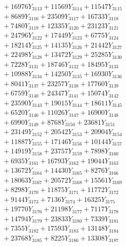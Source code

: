 \documentclass[a4paper,10pt]{article}
\begin{document}
{\begin{align}
&\;  + 16976 Y_{3113} + 11569 Y_{3114} + 11547 Y_{3115} \\[0.3ex]
&\;  + 8689 Y_{3116} + 23509 Y_{3117} + 16733 Y_{3118} \\[0.5ex]\allowbreak
&\;  + 7480 Y_{3119} + 12335 Y_{3120} + 23123 Y_{3121} \\[0.3ex]
&\;  + 24796 Y_{3122} + 17449 Y_{3123} + 6775 Y_{3124} \\[0.3ex]
&\;  + 18214 Y_{3125} + 14135 Y_{3126} + 21442 Y_{3127} \\[0.3ex]
&\;  + 22498 Y_{3128} + 13472 Y_{3129} + 25285 Y_{3130} \\[0.3ex]
&\;  + 7228 Y_{3131} + 18746 Y_{3132} + 18495 Y_{3133} \\[0.3ex]
&\;  + 10988 Y_{3134} + 14250 Y_{3135} + 16930 Y_{3136} \\[0.3ex]
&\;  + 8041 Y_{3137} + 23257 Y_{3138} + 17760 Y_{3139} \\[0.3ex]
&\;  + 6759 Y_{3140} + 24347 Y_{3141} + 15074 Y_{3142} \\[0.3ex]
&\;  + 23590 Y_{3143} + 19015 Y_{3144} + 18611 Y_{3145} \\[0.3ex]
&\;  + 6520 Y_{3146} + 11026 Y_{3147} + 16900 Y_{3148} \\[0.5ex]\allowbreak
&\;  + 6990 Y_{3149} + 8768 Y_{3150} + 23681 Y_{3151} \\[0.3ex]
&\;  + 23149 Y_{3152} + 20542 Y_{3153} + 20904 Y_{3154} \\[0.3ex]
&\;  + 11887 Y_{3155} + 17146 Y_{3156} + 10144 Y_{3157} \\[0.3ex]
&\;  + 14919 Y_{3158} + 23757 Y_{3159} + 7898 Y_{3160} \\[0.3ex]
&\;  + 6935 Y_{3161} + 16793 Y_{3162} + 19044 Y_{3163} \\[0.3ex]
&\;  + 13672 Y_{3164} + 14430 Y_{3165} + 8276 Y_{3166} \\[0.3ex]
&\;  + 18063 Y_{3167} + 20572 Y_{3168} + 15561 Y_{3169} \\[0.3ex]
&\;  + 8298 Y_{3170} + 11875 Y_{3171} + 11772 Y_{3172} \\[0.3ex]
&\;  + 9144 Y_{3173} + 7136 Y_{3174} + 16325 Y_{3175} \\[0.3ex]
&\;  + 19770 Y_{3176} + 21198 Y_{3177} + 7117 Y_{3178} \\[0.5ex]\allowbreak
&\;  + 14794 Y_{3179} + 23833 Y_{3180} + 7339 Y_{3181} \\[0.3ex]
&\;  + 7355 Y_{3182} + 17593 Y_{3183} + 13148 Y_{3184} \\[0.3ex]
&\;  + 23768 Y_{3185} + 8225 Y_{3186} + 13308 Y_{3187} \\[0.3ex]

\end{align}}
\end{document}

